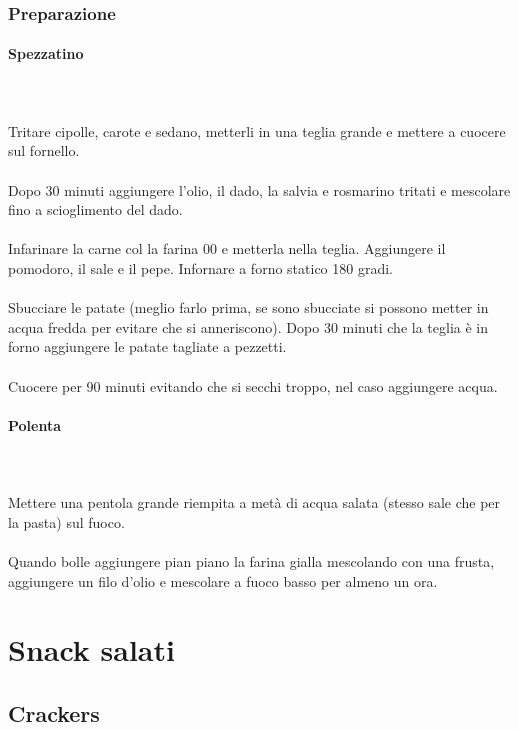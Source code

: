 \documentclass[12pt, a4paper]{article}
\begin{document}
\clearpage
\subsubsection{Preparazione}
	\paragraph{Spezzatino}\mbox{}\\\\ %
	Tritare cipolle, carote e sedano, metterli in una teglia grande
	e mettere a cuocere sul fornello.\\\\
	Dopo 30 minuti aggiungere l'olio, il dado, la salvia e rosmarino
	tritati e mescolare fino a scioglimento del dado.\\\\
	Infarinare la carne col la farina 00 e metterla nella teglia.
	Aggiungere il pomodoro, il sale e il pepe.
	Infornare a forno statico 180 gradi.\\\\
	Sbucciare le patate (meglio farlo prima, se sono sbucciate si
	possono metter in acqua fredda per evitare che si anneriscono).
	Dopo 30 minuti che la teglia è in forno aggiungere le patate
	tagliate a pezzetti.\\\\
	Cuocere per 90 minuti evitando che si secchi troppo, nel caso
	aggiungere acqua.
	\paragraph{Polenta}\mbox{}\\\\
	Mettere una pentola grande riempita
	a metà di acqua salata (stesso sale che per la pasta) sul fuoco.\\\\
	Quando bolle aggiungere pian piano la farina gialla mescolando
	con una frusta, aggiungere un filo d'olio e mescolare a fuoco
	basso per almeno un ora.
\clearpage

\section{Snack salati}

\subsection{Crackers}
\end{document}

